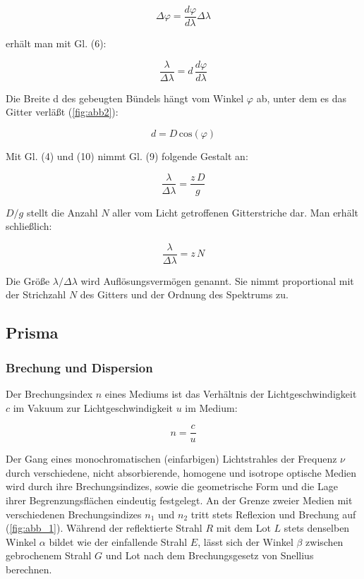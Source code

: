 \documentclass[11pt,ngerman]{scrartcl}
\begin{document}
\begin{equation}
	\Delta \varphi = \frac{d \varphi}{d \lambda} \Delta \lambda
\end{equation}

erhält man mit Gl. (6):

\begin{equation}
	\frac{\lambda}{\Delta \lambda} = d \, \frac{d \varphi}{d \lambda}
\end{equation}

Die Breite d des gebeugten Bündels hängt vom Winkel $\varphi$ ab, unter dem es das Gitter verläßt
(\autoref{fig:abb2}):

\begin{equation}
	d = D \, \textrm{cos}(\varphi)
\end{equation}

Mit Gl. (4) und (10) nimmt Gl. (9) folgende Gestalt an:

\begin{equation}
	\frac{\lambda}{\Delta \lambda} = \frac{z\, D}{g}
	\label{eq:auflvermgitter}
\end{equation}

$D/g$ stellt die Anzahl $N$ aller vom Licht getroffenen Gitterstriche dar. Man erhält schließlich:

\begin{equation}
	\frac{\lambda}{\Delta \lambda} = z\, N
\end{equation}

Die Größe $\lambda / \Delta \lambda$ wird Auflösungsvermögen genannt. Sie nimmt proportional mit der Strichzahl
$N$ des Gitters und der Ordnung des Spektrums zu.


\subsection{Prisma}

\subsubsection{Brechung und Dispersion}

Der Brechungsindex $n$ eines Mediums ist das Verhältnis der Lichtgeschwindigkeit $c$ im Vakuum
zur Lichtgeschwindigkeit $u$ im Medium:

\begin{equation}
	n = \frac{c}{u}
\end{equation}

Der Gang eines monochromatischen (einfarbigen) Lichtstrahles der Frequenz $\nu$ durch verschiedene,
nicht absorbierende, homogene und isotrope optische Medien wird durch ihre Brechungsindizes,
sowie die geometrische Form und die Lage ihrer Begrenzungsflächen eindeutig festgelegt.
An der Grenze zweier Medien mit verschiedenen Brechungsindizes $n_1$ und $n_2$ tritt stets Reflexion
und Brechung auf (\autoref{fig:abb_1}). Während der reflektierte Strahl $R$ mit dem Lot $L$ stets denselben
Winkel $\alpha$ bildet wie der einfallende Strahl $E$, lässt sich der Winkel $\beta$ zwischen gebrochenem
Strahl $G$ und Lot nach dem Brechungsgesetz von Snellius berechnen.
\end{document}
